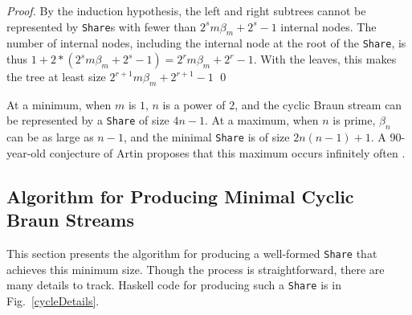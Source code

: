\documentclass[envcountsect]{llncs}
\newcommand{\share}{{\tt Share} }
\begin{document}
\begin{proof}
By the induction hypothesis, the left and right subtrees cannot be represented by {\tt Share}s with fewer than $2^s m \beta_m + 2^s - 1$ internal nodes.
The number of internal nodes, including the internal node at the root of the {\tt Share}, is thus $1+2*(2^s m \beta_m + 2^s - 1) = 2^r m \beta_m + 2^r - 1$.
With the leaves, this makes the tree at least size $2^{r+1} m \beta_m + 2^{r+1} - 1$
\qed
\end{proof}

At a minimum, when $m$ is $1$, $n$ is a power of $2$, and the cyclic Braun stream can be represented by a {\tt Share} of size $4n-1$.
At a maximum, when $n$ is prime, $\beta_n$ can be as large as $n-1$, and the minimal {\tt Share} is of size $2n(n-1)+1$.
A 90-year-old conjecture of Artin proposes that this maximum occurs infinitely often \cite{artin}.

\subsection{Algorithm for Producing Minimal Cyclic Braun Streams}
\label{cycleAlgo}

This section presents the algorithm for producing a well-formed \share that achieves this minimum size.
Though the process is straightforward, there are many details to track.
Haskell code for producing such a \share is in Fig.~\ref{cycleDetails}.
\end{document}
